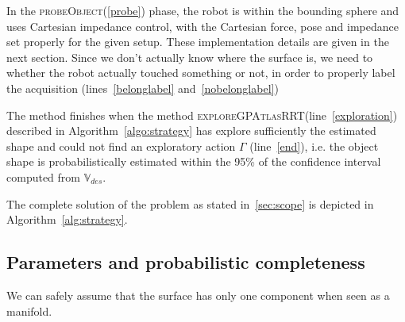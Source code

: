 In the \textsc{probeObject}(\ref{probe}) phase, the robot is within the bounding sphere and uses Cartesian impedance control, with the Cartesian force, pose and impedance set properly for the given setup. These implementation details are given in the next section. Since we don't actually know where the surface is, we need to whether the robot actually touched something or not, in order to properly label the acquisition (lines~\ref{belonglabel} and~\ref{nobelonglabel}) 

The method finishes when the method \textsc{exploreGPAtlasRRT}(line~\ref{exploration}) described in Algorithm~\ref{algo:strategy} has explore sufficiently the estimated shape and could not find an exploratory action $\Gamma$ (line~\ref{end}), i.e. the object shape is probabilistically estimated within the 95\% of the confidence interval computed from $\mathbb{V}_{des}$. 

The complete solution of the problem as stated in~\ref{sec:scope} is depicted in Algorithm~\ref{alg:strategy}.

\subsection{Parameters  and probabilistic completeness}
\label{sec:analsys}

We can safely assume that the surface has only one component when seen as a manifold.
